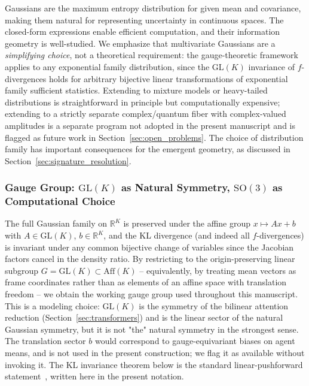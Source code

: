 \documentclass[11pt]{article}
\begin{document}
Gaussians are the maximum entropy distribution for given mean and covariance, making them natural for representing uncertainty in continuous spaces. The closed-form expressions enable efficient computation, and their information geometry is well-studied. We emphasize that multivariate Gaussians are a \emph{simplifying choice}, not a theoretical requirement: the gauge-theoretic framework applies to any exponential family distribution, since the $\mathrm{GL}(K)$ invariance of $f$-divergences holds for arbitrary bijective linear transformations of exponential family sufficient statistics. Extending to mixture models or heavy-tailed distributions is straightforward in principle but computationally expensive; extending to a strictly separate complex/quantum fiber with complex-valued amplitudes is a separate program not adopted in the present manuscript and is flagged as future work in Section~\ref{sec:open_problems}. The choice of distribution family has important consequences for the emergent geometry, as discussed in Section~\ref{sec:signature_resolution}.

\subsubsection{Gauge Group: $\mathrm{GL}(K)$ as Natural Symmetry, $\mathrm{SO}(3)$ as Computational Choice}
\label{sec:gauge_group_choice}

The full Gaussian family on $\mathbb{R}^K$ is preserved under the affine group $x \mapsto Ax + b$ with $A \in \mathrm{GL}(K)$, $b \in \mathbb{R}^K$, and the KL divergence (and indeed all $f$-divergences) is invariant under any common bijective change of variables since the Jacobian factors cancel in the density ratio. By restricting to the origin-preserving linear subgroup $G = \mathrm{GL}(K) \subset \mathrm{Aff}(K)$ -- equivalently, by treating mean vectors as frame coordinates rather than as elements of an affine space with translation freedom -- we obtain the working gauge group used throughout this manuscript. This is a modeling choice: $\mathrm{GL}(K)$ is the symmetry of the bilinear attention reduction (Section~\ref{sec:transformers}) and is the linear sector of the natural Gaussian symmetry, but it is not "the" natural symmetry in the strongest sense. The translation sector $b$ would correspond to gauge-equivariant biases on agent means, and is not used in the present construction; we flag it as available without invoking it. The KL invariance theorem below is the standard linear-pushforward statement~\cite{Amari2016}, written here in the present notation.
\end{document}
